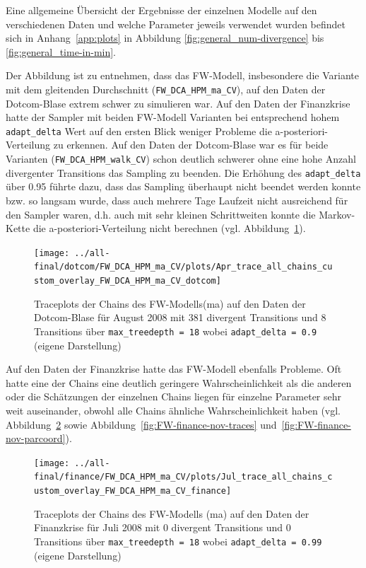 \documentclass[ngerman]{ttlab-qualify}
\begin{document}
Eine allgemeine Übersicht der Ergebnisse der einzelnen Modelle auf den verschiedenen Daten und welche Parameter jeweils verwendet wurden befindet sich in Anhang~\ref{app:plots} in Abbildung \ref{fig:general_num-divergence} bis \ref{fig:general_time-in-min}.  %

Der Abbildung ist zu entnehmen, dass das FW-Modell, insbesondere die Variante mit dem gleitenden Durchschnitt (\texttt{FW\_DCA\_HPM\_ma\_CV}), auf den Daten der Dotcom-Blase extrem schwer zu simulieren war. 
Auf den Daten der Finanzkrise hatte der Sampler mit beiden FW-Modell Varianten bei entsprechend hohem \verb|adapt_delta| Wert auf den ersten Blick weniger Probleme die a-posteriori-Verteilung zu erkennen. Auf den Daten der Dotcom-Blase war es für beide Varianten (\texttt{FW\_DCA\_HPM\_walk\_CV}) schon deutlich schwerer ohne eine hohe Anzahl divergenter Transitions das Sampling zu beenden. Die Erhöhung des \verb|adapt_delta| über 0.95 führte dazu, dass das Sampling überhaupt nicht beendet werden konnte bzw. so langsam wurde, dass auch mehrere Tage Laufzeit nicht ausreichend für den Sampler waren, d.h. auch mit sehr kleinen Schrittweiten konnte die Markov-Kette die a-posteriori-Verteilung nicht berechnen (vgl. Abbildung~\ref{fig:FW-dotcom-aug}).

\begin{figure}[H]
\begin{center}
\texttt{[image: ../all-final/dotcom/FW\_DCA\_HPM\_ma\_CV/plots/Apr\_trace\_all\_chains\_custom\_overlay\_FW\_DCA\_HPM\_ma\_CV\_dotcom]}
\caption{Traceplots der Chains des FW-Modells(ma) auf den Daten der Dotcom-Blase für August 2008 mit 381 divergent Transitions und 8 Transitions über \texttt{max\_treedepth  = 18} wobei \texttt{adapt\_delta = 0.9} (eigene Darstellung)}
\label{fig:FW-dotcom-aug}
\end{center}
\end{figure}

Auf den Daten der Finanzkrise hatte das FW-Modell ebenfalls Probleme. Oft hatte eine der Chains eine deutlich geringere Wahrscheinlichkeit als die anderen oder die Schätzungen der einzelnen Chains liegen für einzelne Parameter sehr weit auseinander, obwohl alle Chains ähnliche Wahrscheinlichkeit haben (vgl. Abbildung~\ref{fig:FW-finance-jul-traces} sowie Abbildung~\ref{fig:FW-finance-nov-traces} und~\ref{fig:FW-finance-nov-parcoord}). 

\begin{figure}[h]%
    \begin{center}
    \texttt{[image: ../all-final/finance/FW\_DCA\_HPM\_ma\_CV/plots/Jul\_trace\_all\_chains\_custom\_overlay\_FW\_DCA\_HPM\_ma\_CV\_finance]}
    \caption{Traceplots der Chains des FW-Modells (ma) auf den Daten der Finanzkrise für Juli 2008 mit 0 divergent Transitions und 0 Transitions über \texttt{max\_treedepth  = 18} wobei \texttt{adapt\_delta = 0.99} (eigene Darstellung)}%
    \label{fig:FW-finance-jul-traces}%
\end{center}
\end{figure}
\end{document}
